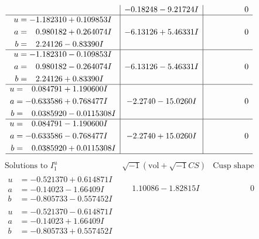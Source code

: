 \documentclass[1p]{elsarticle_modified}
\theoremstyle{definition}
\newcommand{\I}{\sqrt{-1}}
\begin{document}
$$\begin{array}{c|c|c}
 & -0.18248 - 9.21724 I & \phantom{-0.000000 } 0 \\ \hline\begin{aligned}
u &= -1.182310 + 0.109853 I \\
a &= \phantom{-}0.980182 + 0.264074 I \\
b &= \phantom{-}2.24126 - 0.83390 I\end{aligned}
 & -6.13126 + 5.46331 I & \phantom{-0.000000 } 0 \\ \hline\begin{aligned}
u &= -1.182310 - 0.109853 I \\
a &= \phantom{-}0.980182 - 0.264074 I \\
b &= \phantom{-}2.24126 + 0.83390 I\end{aligned}
 & -6.13126 - 5.46331 I & \phantom{-0.000000 } 0 \\ \hline\begin{aligned}
u &= \phantom{-}0.084791 + 1.190600 I \\
a &= -0.633586 + 0.768477 I \\
b &= \phantom{-}0.0385920 - 0.0115308 I\end{aligned}
 & -2.2740 - 15.0260 I & \phantom{-0.000000 } 0 \\ \hline\begin{aligned}
u &= \phantom{-}0.084791 - 1.190600 I \\
a &= -0.633586 - 0.768477 I \\
b &= \phantom{-}0.0385920 + 0.0115308 I\end{aligned}
 & -2.2740 + 15.0260 I & \phantom{-0.000000 } 0\\
 \hline 
 \end{array}$$\newpage$$\begin{array}{c|c|c}  
\text{Solutions to }I^u_{1}& \I (\text{vol} + \sqrt{-1}CS) & \text{Cusp shape}\\
 \hline 
\begin{aligned}
u &= -0.521370 + 0.614871 I \\
a &= -0.14023 - 1.66409 I \\
b &= -0.805733 - 0.557452 I\end{aligned}
 & \phantom{-}1.10086 - 1.82815 I & \phantom{-0.000000 } 0 \\ \hline\begin{aligned}
u &= -0.521370 - 0.614871 I \\
a &= -0.14023 + 1.66409 I \\
b &= -0.805733 + 0.557452 I\end{aligned}

\end{array}$$
\end{document}
